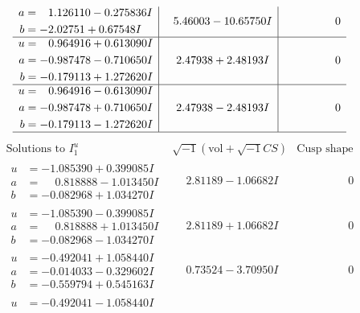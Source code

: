 \documentclass[1p]{elsarticle_modified}
\theoremstyle{definition}
\newcommand{\I}{\sqrt{-1}}
\begin{document}
$$\begin{array}{c|c|c}
\begin{aligned}
a &= \phantom{-}1.126110 - 0.275836 I \\
b &= -2.02751 + 0.67548 I\end{aligned}
 & \phantom{-}5.46003 - 10.65750 I & \phantom{-0.000000 } 0 \\ \hline\begin{aligned}
u &= \phantom{-}0.964916 + 0.613090 I \\
a &= -0.987478 - 0.710650 I \\
b &= -0.179113 + 1.272620 I\end{aligned}
 & \phantom{-}2.47938 + 2.48193 I & \phantom{-0.000000 } 0 \\ \hline\begin{aligned}
u &= \phantom{-}0.964916 - 0.613090 I \\
a &= -0.987478 + 0.710650 I \\
b &= -0.179113 - 1.272620 I\end{aligned}
 & \phantom{-}2.47938 - 2.48193 I & \phantom{-0.000000 } 0\\
 \hline 
 \end{array}$$\newpage$$\begin{array}{c|c|c}  
\text{Solutions to }I^u_{1}& \I (\text{vol} + \sqrt{-1}CS) & \text{Cusp shape}\\
 \hline 
\begin{aligned}
u &= -1.085390 + 0.399085 I \\
a &= \phantom{-}0.818888 - 1.013450 I \\
b &= -0.082968 + 1.034270 I\end{aligned}
 & \phantom{-}2.81189 - 1.06682 I & \phantom{-0.000000 } 0 \\ \hline\begin{aligned}
u &= -1.085390 - 0.399085 I \\
a &= \phantom{-}0.818888 + 1.013450 I \\
b &= -0.082968 - 1.034270 I\end{aligned}
 & \phantom{-}2.81189 + 1.06682 I & \phantom{-0.000000 } 0 \\ \hline\begin{aligned}
u &= -0.492041 + 1.058440 I \\
a &= -0.014033 - 0.329602 I \\
b &= -0.559794 + 0.545163 I\end{aligned}
 & \phantom{-}0.73524 - 3.70950 I & \phantom{-0.000000 } 0 \\ \hline\begin{aligned}
u &= -0.492041 - 1.058440 I \\

\end{aligned}
\end{array}$$
\end{document}
